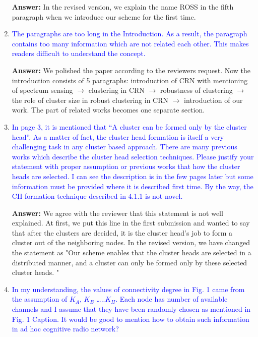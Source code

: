 \documentclass[10pt,a4paper]{article}
\begin{document}
\begin{enumerate}
    \textbf{Answer:} In the revised version, we explain the name ROSS in the fifth paragraph when we introduce our scheme for the first time.
    
\item \textcolor{blue}{  The paragraphs are too long in the Introduction. As a result, the paragraph contains too many information which are not related each other. This makes readers difficult to understand the concept.}
    
    \textbf{Answer:} We polished the paper according to the reviewers request. 
    Now the introduction consists of 5 paragraphs: introduction of CRN with mentioning of spectrum sensing $\rightarrow$ clustering in CRN $\rightarrow$ robustness of clustering $\rightarrow$ the role of cluster size in robust clustering in CRN $\rightarrow$ introduction of our work.
    The part of related works becomes one separate section.
    
\item \textcolor{blue}{   In page 3, it is mentioned that “A cluster can be formed only by the cluster head”. As a matter of fact, the cluster head formation is itself a very challenging task in any cluster based approach. There are many previous works which describe the cluster head selection techniques. Please justify your statement with proper assumption or previous works that how the cluster heads are selected. I can see the description is in the few pages later but some information must be provided where it is described first time. By the way, the CH formation technique described in 4.1.1 is not novel.}

\textbf{Answer:} We agree with the reviewer that this statement is not well explained.
	    At first, we put this line in the first submission and wanted to say that after the clusters are decided, it is the cluster head's job to form a cluster out of the neighboring nodes.
In the revised version, we have changed the statement as "Our scheme enables that the cluster heads are selected in a distributed manner, and a cluster can only be formed only by these selected cluster heads. "
    
\item \textcolor{blue}{  In my understanding, the values of connectivity degree in Fig. 1 came from the assumption of $K_A$, $K_B$ …..$K_H$. Each node has number of available channels and I assume that they have been randomly chosen as mentioned in Fig. 1 Caption. It would be good to mention how to obtain such information in ad hoc cognitive radio network?}


\end{enumerate}
\end{document}
